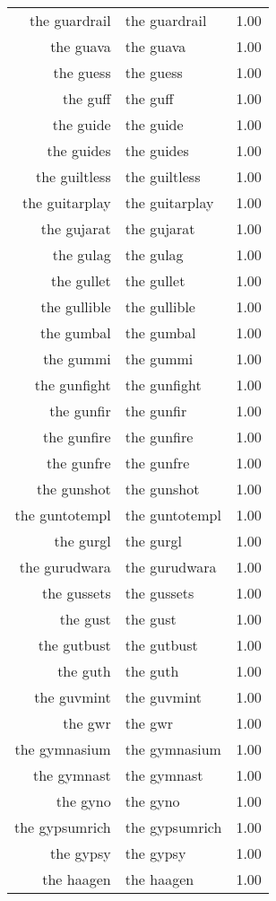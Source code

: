 \begin{table}[ht]
\begin{tabular}{rlr}
  the guardrail & the guardrail & 1.00 \\ 
  the guava & the guava & 1.00 \\ 
  the guess & the guess & 1.00 \\ 
  the guff & the guff & 1.00 \\ 
  the guide & the guide & 1.00 \\ 
  the guides & the guides & 1.00 \\ 
  the guiltless & the guiltless & 1.00 \\ 
  the guitarplay & the guitarplay & 1.00 \\ 
  the gujarat & the gujarat & 1.00 \\ 
  the gulag & the gulag & 1.00 \\ 
  the gullet & the gullet & 1.00 \\ 
  the gullible & the gullible & 1.00 \\ 
  the gumbal & the gumbal & 1.00 \\ 
  the gummi & the gummi & 1.00 \\ 
  the gunfight & the gunfight & 1.00 \\ 
  the gunfir & the gunfir & 1.00 \\ 
  the gunfire & the gunfire & 1.00 \\ 
  the gunfre & the gunfre & 1.00 \\ 
  the gunshot & the gunshot & 1.00 \\ 
  the guntotempl & the guntotempl & 1.00 \\ 
  the gurgl & the gurgl & 1.00 \\ 
  the gurudwara & the gurudwara & 1.00 \\ 
  the gussets & the gussets & 1.00 \\ 
  the gust & the gust & 1.00 \\ 
  the gutbust & the gutbust & 1.00 \\ 
  the guth & the guth & 1.00 \\ 
  the guvmint & the guvmint & 1.00 \\ 
  the gwr & the gwr & 1.00 \\ 
  the gymnasium & the gymnasium & 1.00 \\ 
  the gymnast & the gymnast & 1.00 \\ 
  the gyno & the gyno & 1.00 \\ 
  the gypsumrich & the gypsumrich & 1.00 \\ 
  the gypsy & the gypsy & 1.00 \\ 
  the haagen & the haagen & 1.00 \\ 

\end{tabular}
\end{table}
